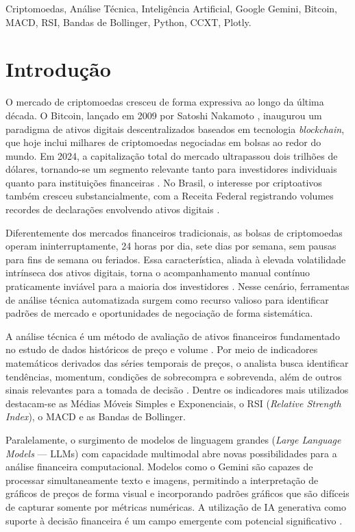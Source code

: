 \documentclass[conference]{IEEEtran}
\begin{document}
\begin{IEEEkeywords}
Criptomoedas, Análise Técnica, Inteligência Artificial, Google Gemini, Bitcoin, MACD, RSI, Bandas de Bollinger, Python, CCXT, Plotly.
\end{IEEEkeywords}

\section{Introdução}

O mercado de criptomoedas cresceu de forma expressiva ao longo da última década. O Bitcoin, lançado em 2009 por Satoshi Nakamoto \cite{nakamoto2008bitcoin}, inaugurou um paradigma de ativos digitais descentralizados baseados em tecnologia \textit{blockchain}, que hoje inclui milhares de criptomoedas negociadas em bolsas ao redor do mundo. Em 2024, a capitalização total do mercado ultrapassou dois trilhões de dólares, tornando-se um segmento relevante tanto para investidores individuais quanto para instituições financeiras \cite{coinmarketcap2024}. No Brasil, o interesse por criptoativos também cresceu substancialmente, com a Receita Federal registrando volumes recordes de declarações envolvendo ativos digitais \cite{pinheiro2019mercado}.

Diferentemente dos mercados financeiros tradicionais, as bolsas de criptomoedas operam ininterruptamente, 24 horas por dia, sete dias por semana, sem pausas para fins de semana ou feriados. Essa característica, aliada à elevada volatilidade intrínseca dos ativos digitais, torna o acompanhamento manual contínuo praticamente inviável para a maioria dos investidores \cite{assaf2012mercado}. Nesse cenário, ferramentas de análise técnica automatizada surgem como recurso valioso para identificar padrões de mercado e oportunidades de negociação de forma sistemática.

A análise técnica é um método de avaliação de ativos financeiros fundamentado no estudo de dados históricos de preço e volume \cite{murphy1999technical}. Por meio de indicadores matemáticos derivados das séries temporais de preços, o analista busca identificar tendências, momentum, condições de sobrecompra e sobrevenda, além de outros sinais relevantes para a tomada de decisão \cite{cavalcante2005mercado}. Dentre os indicadores mais utilizados destacam-se as Médias Móveis Simples e Exponenciais, o RSI (\textit{Relative Strength Index}), o MACD e as Bandas de Bollinger.

Paralelamente, o surgimento de modelos de linguagem grandes (\textit{Large Language Models} — LLMs) com capacidade multimodal abre novas possibilidades para a análise financeira computacional. Modelos como o Gemini \cite{google2024gemini} são capazes de processar simultaneamente texto e imagens, permitindo a interpretação de gráficos de preços de forma visual e incorporando padrões gráficos que são difíceis de capturar somente por métricas numéricas. A utilização de IA generativa como suporte à decisão financeira é um campo emergente com potencial significativo \cite{maia2024inteligencia}.
\end{document}
